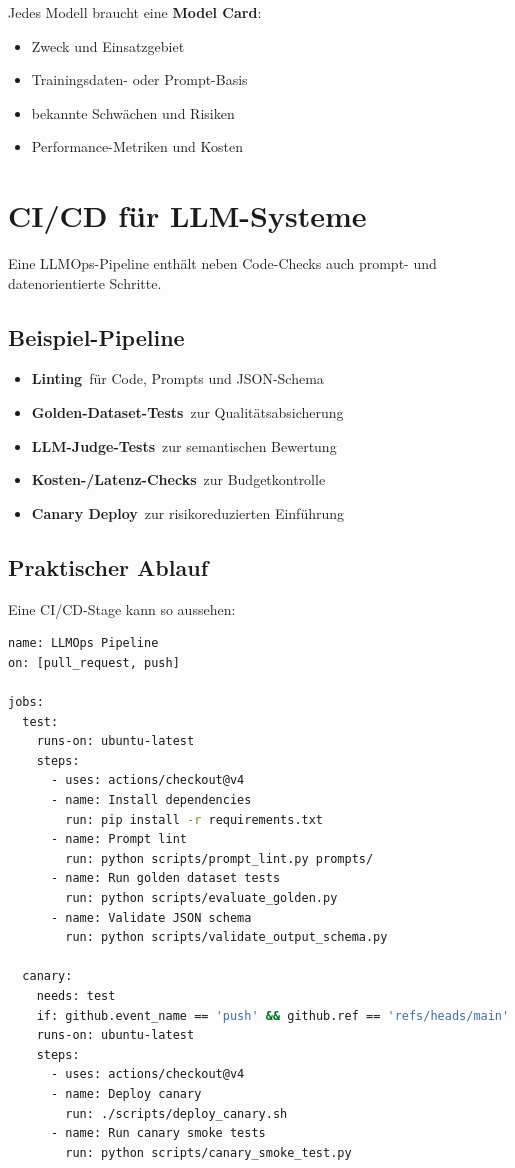 Jedes Modell braucht eine \textbf{Model Card}:

\begin{itemize}[leftmargin=*]
    \item Zweck und Einsatzgebiet
    \item Trainingsdaten- oder Prompt-Basis
    \item bekannte Schwächen und Risiken
    \item Performance-Metriken und Kosten
\end{itemize}

\section{CI/CD für LLM-Systeme}

Eine LLMOps-Pipeline enthält neben Code-Checks auch prompt- und datenorientierte Schritte.

\subsection{Beispiel-Pipeline}

\begin{itemize}[leftmargin=*]
    \item \textbf{Linting}\ für Code, Prompts und JSON-Schema
    \item \textbf{Golden-Dataset-Tests}\ zur Qualitätsabsicherung
    \item \textbf{LLM-Judge-Tests}\ zur semantischen Bewertung
    \item \textbf{Kosten-/Latenz-Checks}\ zur Budgetkontrolle
    \item \textbf{Canary Deploy}\ zur risikoreduzierten Einführung
\end{itemize}

\subsection{Praktischer Ablauf}

Eine CI/CD-Stage kann so aussehen:

\begin{lstlisting}[language=Bash,caption={Beispiel-Workflow für LLMOps in GitHub Actions}]
name: LLMOps Pipeline
on: [pull_request, push]

jobs:
  test:
    runs-on: ubuntu-latest
    steps:
      - uses: actions/checkout@v4
      - name: Install dependencies
        run: pip install -r requirements.txt
      - name: Prompt lint
        run: python scripts/prompt_lint.py prompts/
      - name: Run golden dataset tests
        run: python scripts/evaluate_golden.py
      - name: Validate JSON schema
        run: python scripts/validate_output_schema.py

  canary:
    needs: test
    if: github.event_name == 'push' && github.ref == 'refs/heads/main'
    runs-on: ubuntu-latest
    steps:
      - uses: actions/checkout@v4
      - name: Deploy canary
        run: ./scripts/deploy_canary.sh
      - name: Run canary smoke tests
        run: python scripts/canary_smoke_test.py
\end{lstlisting}

